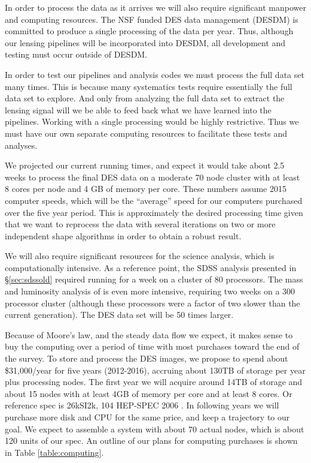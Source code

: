 \documentclass[12pt]{article}
\begin{document}
In order to process the data as it arrives we will also require significant
manpower and computing resources.  The NSF funded DES data management (DESDM)
is committed to produce a single processing of the data per year.  Thus,
although our lensing pipelines will be incorporated into DESDM, all development
and testing must occur outside of DESDM.  

In order to test our pipelines and analysis codes we must process the full data
set many times.  This is because many systematics tests require essentially
the full data set to explore.  And only from analyzing the full data set to
extract the lensing signal will we be able to feed back what we have learned
into the pipelines.  Working with a single processing would be highly
restrictive.  Thus we must have our own separate computing resources to
facilitate these tests and analyses.  

We projected our current running times, and expect it would take about 2.5
weeks to process the final DES data on a moderate 70 node cluster with at least
8 cores per node and 4 GB of memory per core.  These  numbers assume 2015
computer speeds, which will be the ``average'' speed for our computers
purchased over the five year period. This is approximately the desired
processing time given that we want to reprocess the data with several
iterations on two or more independent shape algorithms in order to obtain a
robust result.

We will also require significant resources for the science analysis, which is
computationally intensive.  As a reference point, the SDSS analysis presented
in \S \ref{sec:sdssold} required running for a week on a cluster of 80
processors.  The mass and luminosity analysis of \cite{SheldonM2L07} is even
more intensive, requiring two weeks on a 300 processor cluster (although these
processors were a factor of two slower than the current generation).  The DES
data set will be 50 times larger.

Because of Moore's law, and the steady data flow we expect, it makes sense to
buy the computing over a period of time with most purchases toward the end of
the survey.  To store and process the DES images, we propose to spend about
\$31,000/year for five years (2012-2016), accruing about 130TB of storage per
year plus processing nodes.  The first year we will acquire around 14TB of
storage and about 15 nodes with at least 4GB of memory per core and at least 8
cores.  Or reference spec is 26kSI2k, 104 HEP-SPEC 2006 .  In following years
we will purchase more disk and CPU for the same price, and keep a trajectory to
our goal.  We expect to assemble a system with about 70 actual nodes, which is
about 120 units of our spec.  An outline of our plans for computing purchases
is shown in Table \ref{table:computing}.
\end{document}
